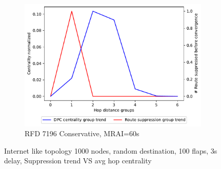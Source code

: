 \begin{figure}[H]
\begin{subfigure}[b]{0.325\textwidth}
     \end{subfigure}
     \hfill
     \begin{subfigure}[b]{0.325\textwidth}
         \centering
         \includegraphics[width=\textwidth]{images/RFD/miceVSelephants/MultiMRAI/60/elephants/cisco_1000_RFD_7196_conservative_nodeConvergence_centVSsup_trend.pdf}
         \caption{\scriptsize RFD 7196 Conservative, MRAI=60s}
         \label{fig:1000_7196RFDC_centVSsup_elephants_MRAI60}
     \end{subfigure}
        \caption{\scriptsize Internet like topology 1000 nodes, random destination, 100 flaps, 3s delay, Suppression trend VS avg hop centrality}
        \label{fig:1000_RFD_centVSsup_elephants}
\end{figure}
\clearpage
